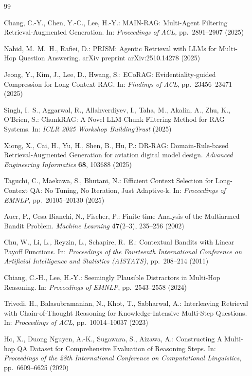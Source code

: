 \documentclass[runningheads]{llncs}
\begin{document}
\begin{thebibliography}{99}
\begin{sloppypar}
Chang, C.-Y., Chen, Y.-C., Lee, H.-Y.:
MAIN-RAG: Multi-Agent Filtering Retrieval-Augmented Generation.
In: \emph{Proceedings of ACL}, pp.~2891--2907 (2025)
\end{sloppypar}

Nahid, M.~M.~H., Rafiei, D.:
PRISM: Agentic Retrieval with LLMs for Multi-Hop Question Answering.
arXiv preprint arXiv:2510.14278 (2025)

Jeong, Y., Kim, J., Lee, D., Hwang, S.:
ECoRAG: Evidentiality-guided Compression for Long Context RAG.
In: \emph{Findings of ACL}, pp.~23456--23471 (2025)

Singh, I.~S., Aggarwal, R., Allahverdiyev, I., Taha, M., Akalin, A., Zhu, K., O'Brien, S.:
ChunkRAG: A Novel LLM-Chunk Filtering Method for RAG Systems.
In: \emph{ICLR 2025 Workshop BuildingTrust} (2025)

Xiong, X., Cai, H., Yu, H., Shen, B., Hu, P.:
DR-RAG: Domain-Rule-based Retrieval-Augmented Generation for aviation digital model design.
\emph{Advanced Engineering Informatics} \textbf{68}, 103688 (2025)

Taguchi, C., Maekawa, S., Bhutani, N.:
Efficient Context Selection for Long-Context QA: No Tuning, No Iteration, Just Adaptive-k.
In: \emph{Proceedings of EMNLP}, pp.~20105--20130 (2025)

Auer, P., Cesa-Bianchi, N., Fischer, P.:
Finite-time Analysis of the Multiarmed Bandit Problem.
\emph{Machine Learning} \textbf{47}(2--3), 235--256 (2002)

Chu, W., Li, L., Reyzin, L., Schapire, R.~E.:
Contextual Bandits with Linear Payoff Functions.
In: \emph{Proceedings of the Fourteenth International Conference on Artificial Intelligence and Statistics (AISTATS)}, pp.~208--214 (2011)

Chiang, C.-H., Lee, H.-Y.:
Seemingly Plausible Distractors in Multi-Hop Reasoning.
In: \emph{Proceedings of EMNLP}, pp.~2543--2558 (2024)

Trivedi, H., Balasubramanian, N., Khot, T., Sabharwal, A.:
Interleaving Retrieval with Chain-of-Thought Reasoning for Knowledge-Intensive Multi-Step Questions.
In: \emph{Proceedings of ACL}, pp.~10014--10037 (2023)

Ho, X., Duong Nguyen, A.-K., Sugawara, S., Aizawa, A.:
Constructing A Multi-hop QA Dataset for Comprehensive Evaluation of Reasoning Steps.
In: \emph{Proceedings of the 28th International Conference on Computational Linguistics},
pp.~6609--6625 (2020)


\end{thebibliography}
\end{document}

